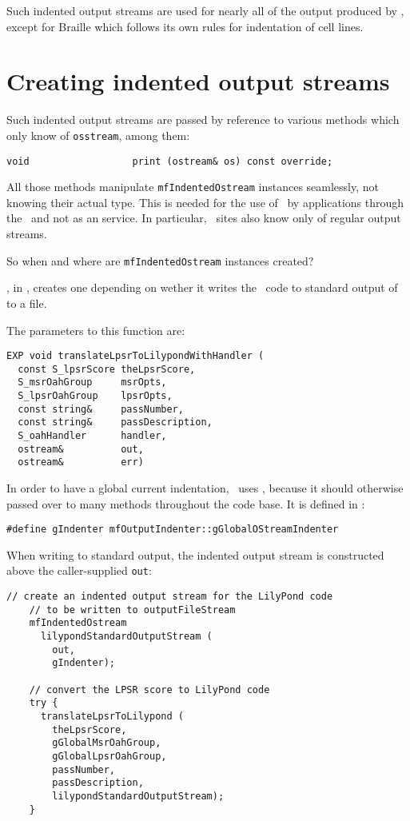 Such indented output streams are used for nearly all of the output produced by \mf, except for Braille which follows its own rules for indentation of cell lines.


\section{Creating indented output streams}

Such indented output streams are passed by reference to various methods which only know of {\tt osstream}, among them:
\begin{lstlisting}[language=CPlusPlus]
    void                  print (ostream& os) const override;
\end{lstlisting}

All those methods manipulate {\tt mfIndentedOstream} instances seamlessly, not knowing their actual type.
This is needed for the use of \mf\ by applications through the \API\ and not as an service. In particular, \Web\ sites also know only of regular output streams.

So when and where are {\tt mfIndentedOstream} instances created?

, in , creates one depending on wether it writes the \lily\ code to standard output of to a file.

The parameters to this function are:
\begin{lstlisting}[language=CPlusPlus]
EXP void translateLpsrToLilypondWithHandler (
  const S_lpsrScore theLpsrScore,
  S_msrOahGroup     msrOpts,
  S_lpsrOahGroup    lpsrOpts,
  const string&     passNumber,
  const string&     passDescription,
  S_oahHandler      handler,
  ostream&          out,
  ostream&          err)
\end{lstlisting}

In order to have a global current indentation, \mf\ uses , because it should otherwise passed over to many methods throughout the code base. It is defined in :
\begin{lstlisting}[language=CPlusPlus]
#define gIndenter mfOutputIndenter::gGlobalOStreamIndenter
\end{lstlisting}

When writing to standard output, the indented output stream is constructed above the caller-supplied {\tt out}:
\begin{lstlisting}[language=CPlusPlus]
    // create an indented output stream for the LilyPond code
    // to be written to outputFileStream
    mfIndentedOstream
      lilypondStandardOutputStream (
        out,
        gIndenter);

    // convert the LPSR score to LilyPond code
    try {
      translateLpsrToLilypond (
        theLpsrScore,
        gGlobalMsrOahGroup,
        gGlobalLpsrOahGroup,
        passNumber,
        passDescription,
        lilypondStandardOutputStream);
    }
\end{lstlisting}

